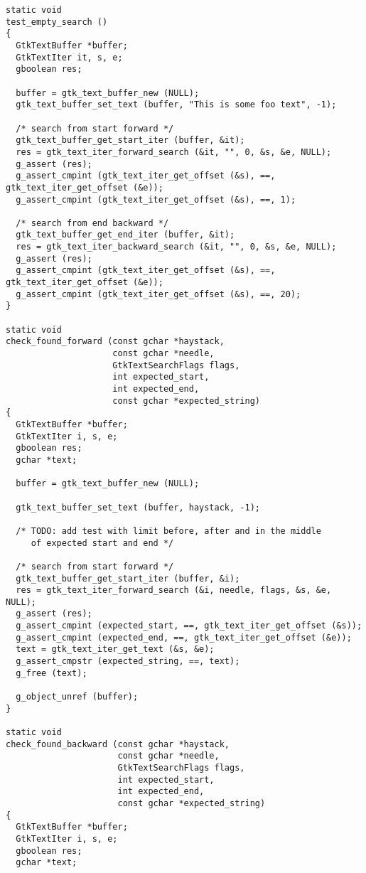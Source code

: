 \begin{lstlisting}[style=plain]
static void
test_empty_search ()
{
  GtkTextBuffer *buffer;
  GtkTextIter it, s, e;
  gboolean res;

  buffer = gtk_text_buffer_new (NULL);
  gtk_text_buffer_set_text (buffer, "This is some foo text", -1);

  /* search from start forward */
  gtk_text_buffer_get_start_iter (buffer, &it);
  res = gtk_text_iter_forward_search (&it, "", 0, &s, &e, NULL);
  g_assert (res);
  g_assert_cmpint (gtk_text_iter_get_offset (&s), ==, gtk_text_iter_get_offset (&e));
  g_assert_cmpint (gtk_text_iter_get_offset (&s), ==, 1);

  /* search from end backward */
  gtk_text_buffer_get_end_iter (buffer, &it);
  res = gtk_text_iter_backward_search (&it, "", 0, &s, &e, NULL);
  g_assert (res);
  g_assert_cmpint (gtk_text_iter_get_offset (&s), ==, gtk_text_iter_get_offset (&e));
  g_assert_cmpint (gtk_text_iter_get_offset (&s), ==, 20);
}

static void
check_found_forward (const gchar *haystack,
                     const gchar *needle,
                     GtkTextSearchFlags flags,
                     int expected_start,
                     int expected_end,
                     const gchar *expected_string)
{
  GtkTextBuffer *buffer;
  GtkTextIter i, s, e;
  gboolean res;
  gchar *text;

  buffer = gtk_text_buffer_new (NULL);

  gtk_text_buffer_set_text (buffer, haystack, -1);

  /* TODO: add test with limit before, after and in the middle
     of expected start and end */

  /* search from start forward */
  gtk_text_buffer_get_start_iter (buffer, &i);
  res = gtk_text_iter_forward_search (&i, needle, flags, &s, &e, NULL);
  g_assert (res);
  g_assert_cmpint (expected_start, ==, gtk_text_iter_get_offset (&s));
  g_assert_cmpint (expected_end, ==, gtk_text_iter_get_offset (&e));
  text = gtk_text_iter_get_text (&s, &e);
  g_assert_cmpstr (expected_string, ==, text);
  g_free (text);

  g_object_unref (buffer);
}

static void
check_found_backward (const gchar *haystack,
                      const gchar *needle,
                      GtkTextSearchFlags flags,
                      int expected_start,
                      int expected_end,
                      const gchar *expected_string)
{
  GtkTextBuffer *buffer;
  GtkTextIter i, s, e;
  gboolean res;
  gchar *text;


\end{lstlisting}
